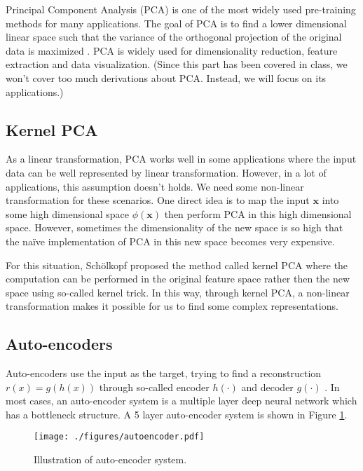 \documentclass{article}
\begin{document}
Principal Component Analysis (PCA) is one of the most widely used pre-training methods for many applications. The goal of PCA is to find a lower dimensional linear space such that the variance of the orthogonal projection of the original data is maximized \cite{bishop2007pattern}. PCA is widely used for dimensionality reduction, feature extraction and data visualization. (Since this part has been covered in class, we won't cover too much derivations about PCA. Instead, we will focus on its applications.)

\subsection{Kernel PCA}

As a linear transformation, PCA works well in some applications where the input data can be well represented by linear transformation. However, in a lot of applications, this assumption doesn't holds. We need some non-linear transformation for these scenarios. One direct idea is to map the input $\pmb{x}$ into some high dimensional space $\phi(\pmb{x})$ then perform PCA in this high dimensional space. However, sometimes the dimensionality of the new space is so high that the na\"{i}ve implementation of PCA in this new space becomes very expensive. 

For this situation, Sch\"{o}lkopf \cite{scholkopf1998nonlinear, friedman2001elements} proposed the method called kernel PCA where the computation can be performed in the original feature space rather then the new space using so-called kernel trick. In this way, through kernel PCA, a non-linear transformation makes it possible for us to find some complex representations. 

\subsection{Auto-encoders}

Auto-encoders use the input as the target, trying to find a reconstruction $r(x) = g(h(x))$ through so-called encoder $h(\cdot)$ and decoder $g(\cdot)$ \cite{bengio2012deep}. In most cases, an auto-encoder system is a multiple layer deep neural network which has a bottleneck structure. A 5 layer auto-encoder system is shown in Figure \ref{fig:autoencoder}.

\begin{figure}[htb]
\centering
\texttt{[image: ./figures/autoencoder.pdf]}
\caption{Illustration of auto-encoder system.}
\label{fig:autoencoder}
\end{figure}
\end{document}
